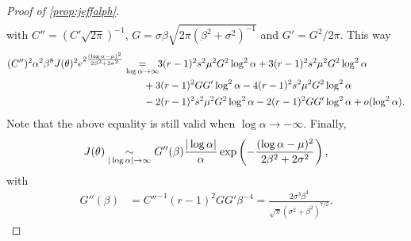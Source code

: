 \begin{proof}[Proof of \cref{prop:jeffalph}]
\begin{align}
\end{align}
%
with $C''=(C'\sqrt{2\pi})^{-1}$, $G=\sigma\beta\sqrt{2\pi(\beta^2+\sigma^2)^{-1}}$ and $G'=G^2/2\pi$. 
This way
\begin{align}\nonumber
    (C'')^2\alpha^2\beta^{8} J(\theta)^2e^{2\frac{(\log\alpha-\mu)^2}{2\beta^2+2\sigma^2}}
      &  \aseq{\log\alpha\rightarrow\infty}\hspace*{-4pt}  
        3(r-1)^2s^2\mu^2G^2\log^2\alpha 
        + 3(r-1)^2s^2\mu^2G^2\log^2\alpha \\
        &\hspace*{2em} +3 (r-1)^2GG'\log^2\alpha 
        - 4(r-1)^2s^2\mu^2G^2\log^2\alpha \\
        &\hspace*{2em} - 2(r-1)^2s^2\mu^2G^2\log^2\alpha - 2(r-1)^2GG'\log^2\alpha %
        + o(\log^2\alpha).\nonumber
\end{align}
Note that the above equality is still valid when $\log\alpha\to-\infty$. Finally,
\begin{equation}
    J(\theta) \underset{|\log\alpha|\rightarrow\infty}{\sim} G''(\beta)\frac{|\log\alpha|}{\alpha}\exp\left(-\frac{(\log\alpha-\mu)^2}{2\beta^2+2\sigma^2}\right)  ,
\end{equation}
with 
\begin{align}
    G''(\beta) &=C''^{-1}(r-1)^2GG'\beta^{-4} 
        = \frac{2\sigma^3\beta^3 }{\sqrt{\pi}(\sigma^2+\beta^2)^{7/2}}. %
\end{align}


\end{proof}

